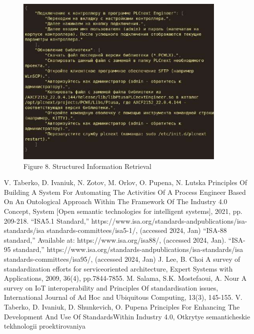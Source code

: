 \documentclass[11pt,final]{article}
\begin{document}
\begin{multicols}{2}
            \vspace{1.5em}

        \begin{figure}[H]
            \centering
            \includegraphics[width=1.0135\linewidth]{6_mat.jpg}
            \label{fig:enter-label}
            {\scriptsize Figure 8. Structured Information Retrieval}
        \end{figure}

            \vspace{-2em}

        \begin{thebibliography}{7} \setcounter{enumiv}{3}
        \setlength{\parskip}{-3.5pt} 
            \scriptsize\bibitem{} V. Taberko, D. Ivaniuk, N. Zotov, M. Orlov, O. Pupena, N. Lutska Principles Of Building A System For Automating The Activities Of A Process Engineer Based On An Ontological Approach Within The Framework Of The Industry 4.0 Concept, System [Open semantic technologies for intelligent systems], 2021, pp. 209-218.
            \scriptsize\bibitem{} “ISA5.1 Standard,” https://www.isa.org/standards-andpublications/isa-standards/isa standards-committees/isa5-1/, (accessed 2024, Jan)
            \scriptsize\bibitem{}  “ISA-88 standard,” Available at: https://www.isa.org/isa88/, (accessed 2024, Jan).
            \scriptsize\bibitem{}   “ISA-95 standard,” https://www.isa.org/standards-andpublications/isa-standards/isa standards-committees/isa95/, (accessed 2024, Jan)
            \scriptsize\bibitem{}  J. Lee, B. Choi A survey of standardization efforts for serviceoriented architecture, Expert Systems with Applications, 2009, 36(4), pp.7844-7855.
            \scriptsize\bibitem{} M. Salama, S.K. Mostefaoui, A. Nour A survey on IoT interoperability and Principles Of standardisation issues, International Journal of Ad Hoc and Ubiquitous Computing, 13(3), 145-155.
            \scriptsize\bibitem{} V. Taberko, D. Ivaniuk, D. Shunkevich, O. Pupena Principles For Enhancing The Development And Use Of StandardsWithin Industry 4.0, Otkrytye semanticheskie tekhnologii proektirovaniya
        \end{thebibliography}
    \end{multicols}
    
\end{document}
